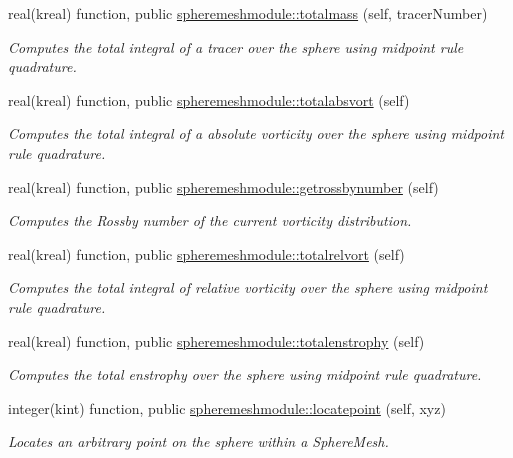 \begin{DoxyCompactItemize}
real(kreal) function, public \hyperlink{group__SphereMesh_gaff88fd47f20601b9ce1fc3b80f66c180}{spheremeshmodule\+::totalmass} (self, tracer\+Number)
\begin{DoxyCompactList}\small\item\em Computes the total integral of a tracer over the sphere using midpoint rule quadrature. \end{DoxyCompactList}\item 
real(kreal) function, public \hyperlink{group__SphereMesh_ga73b1f415fd585597ed3d213632cbf8d9}{spheremeshmodule\+::totalabsvort} (self)
\begin{DoxyCompactList}\small\item\em Computes the total integral of a absolute vorticity over the sphere using midpoint rule quadrature. \end{DoxyCompactList}\item 
real(kreal) function, public \hyperlink{group__SphereMesh_ga328b7708b010b001ba36e802abb3c863}{spheremeshmodule\+::getrossbynumber} (self)
\begin{DoxyCompactList}\small\item\em Computes the Rossby number of the current vorticity distribution. \end{DoxyCompactList}\item 
real(kreal) function, public \hyperlink{group__SphereMesh_gabe01464cd105cc5c2f2d2c577bb3eea2}{spheremeshmodule\+::totalrelvort} (self)
\begin{DoxyCompactList}\small\item\em Computes the total integral of relative vorticity over the sphere using midpoint rule quadrature. \end{DoxyCompactList}\item 
real(kreal) function, public \hyperlink{group__SphereMesh_ga3bbd7e4f63fe3cffaff0220681c612d4}{spheremeshmodule\+::totalenstrophy} (self)
\begin{DoxyCompactList}\small\item\em Computes the total enstrophy over the sphere using midpoint rule quadrature. \end{DoxyCompactList}\item 
integer(kint) function, public \hyperlink{group__SphereMesh_ga7d024751a0858a280b313d29f360c973}{spheremeshmodule\+::locatepoint} (self, xyz)
\begin{DoxyCompactList}\small\item\em Locates an arbitrary point on the sphere within a Sphere\+Mesh. \end{DoxyCompactList}\item 

\end{DoxyCompactItemize}
